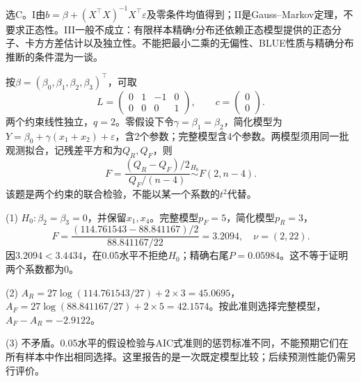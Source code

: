选C。I由$b=\beta+(X^\top X)^{-1}X^\top\varepsilon$及零条件均值得到；II是Gauss--Markov定理，不要求正态性。III一般不成立：有限样本精确$t$分布还依赖正态模型提供的正态分子、卡方方差估计以及独立性。不能把最小二乘的无偏性、BLUE性质与精确分布推断的条件混为一谈。
\par\nobreak\smallskip{}

按$\beta=(\beta_0,\beta_1,\beta_2,\beta_3)^\top$，可取\[L=\begin{pmatrix}0&1&-1&0\\0&0&0&1\end{pmatrix},\qquad c=\begin{pmatrix}0\\0\end{pmatrix}.\]两个约束线性独立，$q=2$。零假设下令$\gamma=\beta_1=\beta_2$，简化模型为$Y=\beta_0+\gamma(x_1+x_2)+\varepsilon$，含2个参数；完整模型含4个参数。两模型须用同一批观测拟合，记残差平方和为$Q_R,Q_F$，则\[F=\frac{(Q_R-Q_F)/2}{Q_F/(n-4)}\overset{H_0}{\sim}F(2,n-4).\]该题是两个约束的联合检验，不能以某一个系数的$t^2$代替。
\par\nobreak\smallskip{}

(1) $H_0:\beta_2=\beta_3=0$，并保留$x_1,x_4$。完整模型$p_F=5$，简化模型$p_R=3$，\[F=\frac{(114.761543-88.841167)/2}{88.841167/22}=3.2094,\quad\nu=(2,22).\]因$3.2094<3.4434$，在0.05水平不拒绝$H_0$；精确右尾$P=0.05984$。这不等于证明两个系数都为0。\par (2) $A_R=27\log(114.761543/27)+2\times3=45.0695$，$A_F=27\log(88.841167/27)+2\times5=42.1574$。按此准则选择完整模型，$A_F-A_R=-2.9122$。\par (3) 不矛盾。0.05水平的假设检验与AIC式准则的惩罚标准不同，不能预期它们在所有样本中作出相同选择。这里报告的是一次既定模型比较；后续预测性能仍需另行评价。
\par\nobreak\smallskip{}

